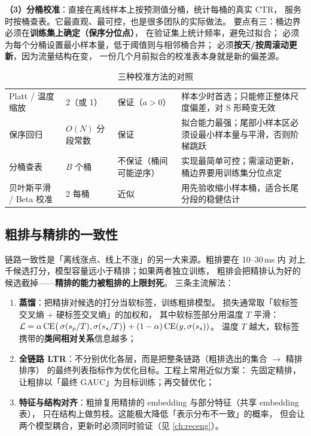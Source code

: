 \textbf{（3）分桶校准}：直接在离线样本上按预测值分桶，统计每桶的真实 CTR，
服务时按桶查表。它最直观、最可控，也是很多团队的实际做法。
要点有三：桶边界必须在\textbf{训练集上确定（保序分位点）}，
在验证集上统计频率，避免过拟合；
必须为每个分桶设置最小样本量，低于阈值则与相邻桶合并；
必须\textbf{按天/按周滚动更新}，因为流量结构在变，
一份几个月前拟合的校准表本身就是新的偏差源。

\begin{table}[htbp]
\centering
\caption{三种校准方法的对照}
\label{tab:calibration}
\small
\begin{tabularx}{\textwidth}{L{1.9cm} L{2.1cm} L{2.0cm} Y}
\toprule
{} &  &  &  \\
\midrule
Platt / 温度缩放 & 2（或 1） & 保证（$a>0$） & 样本少时首选；只能修正整体尺度偏差，对 S 形畸变无效 \\
\addlinespace
保序回归 & $O(N)$ 分段常数 & 保证 & 拟合能力最强；尾部小样本区必须设最小样本量与平滑，否则阶梯跳跃 \\
\addlinespace
分桶查表 & $B$ 个桶 & 不保证（桶间可能逆序） & 实现最简单可控；需滚动更新，桶边界要用训练集分位点定 \\
\addlinespace
贝叶斯平滑 / Beta 校准 & 2 每桶 & 近似 & 用先验收缩小样本桶，适合长尾分段的稳健估计 \\
\bottomrule
\end{tabularx}
\end{table}

\subsection{粗排与精排的一致性}

链路一致性是「离线涨点、线上不涨」的另一大来源。粗排要在 10--30\,ms 内
对上千候选打分，模型容量远小于精排；如果两者独立训练，
粗排会把精排认为好的候选截掉——\textbf{精排的能力被粗排的上限封死}。
三条主流解法：

\begin{enumerate}
  \item \textbf{蒸馏}：把精排对候选的打分当软标签，训练粗排模型。
        损失通常取「软标签交叉熵 + 硬标签交叉熵」的加权和，
        其中软标签部分用温度 $T$ 平滑：
        $\mathcal{L} = \alpha \, \mathrm{CE}\big(\operatorname{\sigma}(s_p/T), \operatorname{\sigma}(s_s/T)\big)
        + (1-\alpha) \, \mathrm{CE}(y, \operatorname{\sigma}(s_s))$。
        温度 $T$ 越大，软标签携带的\textbf{类间相对关系}信息越多；
  \item \textbf{全链路 LTR}：不分别优化各层，而是把整条链路（粗排选出的集合 $\to$ 精排排序）
        的最终列表指标作为优化目标。工程上常用近似方案：
        先固定精排，让粗排以「最终 GAUC」为目标训练；再交替优化；
  \item \textbf{特征与结构对齐}：粗排复用精排的 embedding 与部分特征（共享 embedding 表），
        只在结构上做剪枝。这能极大降低「表示分布不一致」的概率，
        但会让两个模型耦合，更新时必须同时验证（见 \cref{ch:receng}）。
\end{enumerate}

